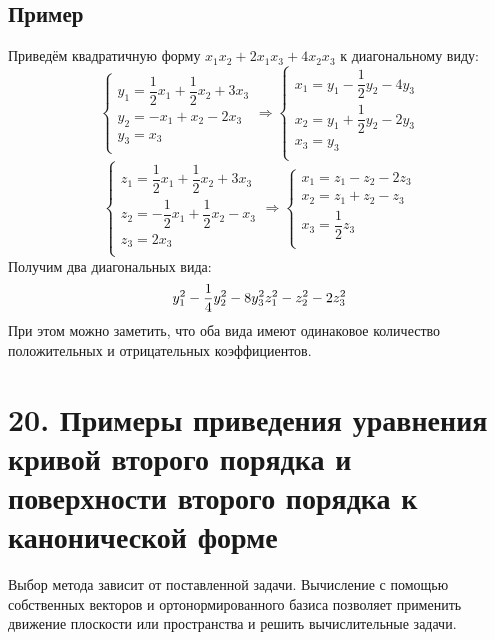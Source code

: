 \documentclass[12pt]{article}
\begin{document}
\subsection{Пример}
Приведём квадратичную форму $x_1x_2 + 2x_1x_3 + 4x_2x_3$ к диагональному виду:
\[
    \begin{cases}
        y_1 = \dfrac{1}{2}x_1 + \dfrac{1}{2}x_2 + 3x_3 \\
        y_2 = -x_1 + x_2 - 2x_3                        \\
        y_3 = x_3                                      \\
    \end{cases} \Rightarrow
    \begin{cases}
        x_1 = y_1 - \dfrac{1}{2}y_2 - 4y_3 \\
        x_2 = y_1 + \dfrac{1}{2}y_2 - 2y_3 \\
        x_3 = y_3                          \\
    \end{cases}
\]
\[
    \begin{cases}
        z_1 = \dfrac{1}{2}x_1 + \dfrac{1}{2}x_2 + 3x_3 \\
        z_2 = -\dfrac{1}{2}x_1 + \dfrac{1}{2}x_2 - x_3 \\
        z_3 = 2x_3                                     \\
    \end{cases} \Rightarrow
    \begin{cases}
        x_1 = z_1 - z_2 - 2z_3 \\
        x_2 = z_1 + z_2 - z_3  \\
        x_3 = \dfrac{1}{2}z_3  \\
    \end{cases}
\]
Получим два диагональных вида:
\[
    y_1^2 - \dfrac{1}{4}y_2^2 - 8y_3^2 \\ z_1^2 - z_2^2 - 2z_3^2
\]
При этом можно заметить, что оба вида имеют одинаковое количество положительных и отрицательных коэффициентов.

\section{20. Примеры приведения уравнения кривой второго порядка и поверхности второго порядка к канонической форме}
Выбор метода зависит от поставленной задачи. Вычисление с помощью собственных векторов и ортонормированного базиса позволяет применить движение плоскости или пространства и решить вычислительные задачи.
\end{document}
